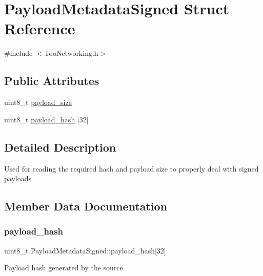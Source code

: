 \hypertarget{structPayloadMetadataSigned}{}\section{Payload\+Metadata\+Signed Struct Reference}
\label{structPayloadMetadataSigned}


{\ttfamily \#include $<$Too\+Networking.\+h$>$}

\subsection*{Public Attributes}
\begin{DoxyCompactItemize}
\item 
uint8\+\_\+t \hyperlink{structPayloadMetadataSigned_abf46bec0fabc0f65167510b5db34df72}{payload\+\_\+size}
\item 
uint8\+\_\+t \hyperlink{structPayloadMetadataSigned_abad90d881990387828318522f880b8a0}{payload\+\_\+hash} \mbox{[}32\mbox{]}
\end{DoxyCompactItemize}


\subsection{Detailed Description}
Used for reading the required hash and payload size to properly deal with signed payloads 

\subsection{Member Data Documentation}
\mbox{\label{structPayloadMetadataSigned_abad90d881990387828318522f880b8a0}} 
\subsubsection{\texorpdfstring{payload\+\_\+hash}{payload\_hash}}
{\footnotesize\ttfamily uint8\+\_\+t Payload\+Metadata\+Signed\+::payload\+\_\+hash\mbox{[}32\mbox{]}}

Payload hash generated by the source \mbox{\label{structPayloadMetadataSigned_abf46bec0fabc0f65167510b5db34df72}} 
